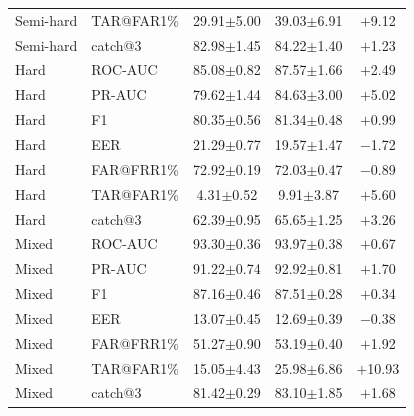 \documentclass[11pt]{article}
\begin{document}
\begin{table}[!t]
\begin{minipage}[t]{0.48\textwidth}
\begin{tabular}{l l c c c}
Semi-hard & TAR@FAR1\% & 29.91$\pm$5.00 & 39.03$\pm$6.91 & $+$9.12 \\
Semi-hard & catch@3    & 82.98$\pm$1.45 & 84.22$\pm$1.40 & $+$1.23 \\
\midrule
Hard      & ROC-AUC    & 85.08$\pm$0.82 & 87.57$\pm$1.66 & $+$2.49 \\
Hard      & PR-AUC     & 79.62$\pm$1.44 & 84.63$\pm$3.00 & $+$5.02 \\
Hard      & F1         & 80.35$\pm$0.56 & 81.34$\pm$0.48 & $+$0.99 \\
Hard      & EER        & 21.29$\pm$0.77 & 19.57$\pm$1.47 & $-$1.72 \\
Hard      & FAR@FRR1\% & 72.92$\pm$0.19 & 72.03$\pm$0.47 & $-$0.89 \\
Hard      & TAR@FAR1\% & \phantom{0}4.31$\pm$0.52 & \phantom{0}9.91$\pm$3.87 & $+$5.60 \\
Hard      & catch@3    & 62.39$\pm$0.95 & 65.65$\pm$1.25 & $+$3.26 \\
\midrule
Mixed     & ROC-AUC    & 93.30$\pm$0.36 & 93.97$\pm$0.38 & $+$0.67 \\
Mixed     & PR-AUC     & 91.22$\pm$0.74 & 92.92$\pm$0.81 & $+$1.70 \\
Mixed     & F1         & 87.16$\pm$0.46 & 87.51$\pm$0.28 & $+$0.34 \\
Mixed     & EER        & 13.07$\pm$0.45 & 12.69$\pm$0.39 & $-$0.38 \\
Mixed     & FAR@FRR1\% & 51.27$\pm$0.90 & 53.19$\pm$0.40 & $+$1.92 \\
Mixed     & TAR@FAR1\% & 15.05$\pm$4.43 & 25.98$\pm$6.86 & $+$10.93 \\
Mixed     & catch@3    & 81.42$\pm$0.29 & 83.10$\pm$1.85 & $+$1.68 \\
\bottomrule
\end{tabular}
\label{tab:app_wc_electra}
\end{minipage}
\end{table}
\end{document}
